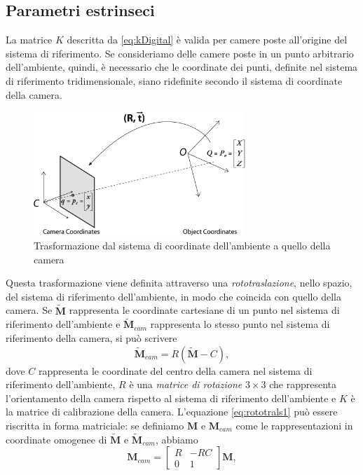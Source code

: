  \subsection{Parametri estrinseci}
 La matrice $K$ descritta da \eqref{eq:kDigital} \`e valida per camere poste all'origine del sistema di riferimento.
Se consideriamo delle camere poste in un punto arbitrario dell'ambiente, quindi, \`e necessario che le coordinate dei punti, definite nel sistema di riferimento tridimensionale, siano ridefinite secondo il sistema di coordinate della camera.
 \begin{figure}[tb]
 	\centering
 	\includegraphics[width=8cm]{./pictures/rt}
 	\caption{Trasformazione dal sistema di coordinate dell'ambiente a quello della camera}
 	\label{fig:rt}
 \end{figure}
Questa trasformazione viene definita attraverso una \textit{rototraslazione}, nello spazio, del sistema di riferimento dell'ambiente, in modo che coincida con quello della camera.
Se $\tilde{\textbf{M}}$ rappresenta le coordinate cartesiane di un punto nel sistema di riferimento dell'ambiente e $\tilde{\textbf{M}}_{cam}$ rappresenta lo stesso punto nel sistema di riferimento della camera, si pu\`o scrivere
\begin{equation}
\label{eq:rototrals1}
\tilde{\textbf{M}}_{cam}=R(\tilde{\textbf{M}} - C),
\end{equation}
dove $C$ rappresenta le coordinate del centro della camera nel sistema di riferimento dell'ambiente, $R$ \`e una \textit{matrice di rotazione} $3 \times 3$ che rappresenta l'orientamento della camera rispetto al sistema di riferimento dell'ambiente e $K$ \`e la matrice di calibrazione della camera.
L'equazione \eqref{eq:rototrals1} pu\`o essere riscritta in forma matriciale: se definiamo $\textbf{M}$ e $\textbf{M}_{cam}$ come le rappresentazioni in coordinate omogenee di $\tilde{\textbf{M}}$ e $\tilde{\textbf{M}}_{cam}$, abbiamo
\[ \textbf{M}_{cam} =  \left[\begin{array}{cc}
R & -RC \\
0 & 1
\end{array}\right] 
\textbf{M}, \]
